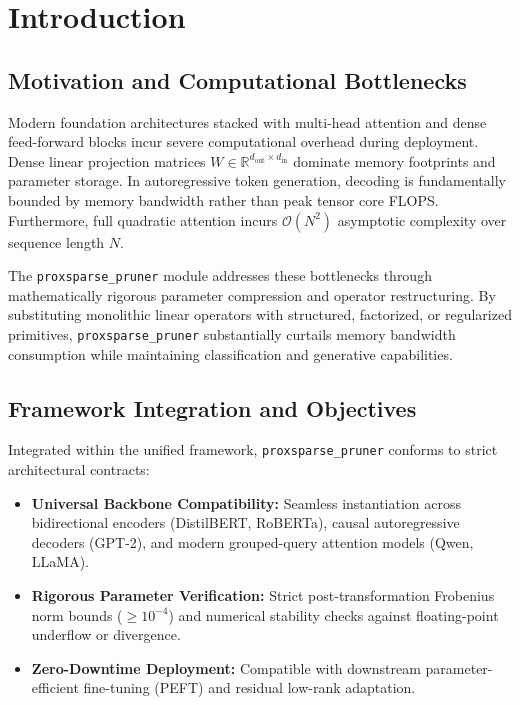 \section{Introduction}

\subsection{Motivation and Computational Bottlenecks}
Modern foundation architectures stacked with multi-head attention and dense feed-forward blocks incur severe computational overhead during deployment. Dense linear projection matrices $W \in \mathbb{R}^{d_{\text{out}} \times d_{\text{in}}}$ dominate memory footprints and parameter storage. In autoregressive token generation, decoding is fundamentally bounded by memory bandwidth rather than peak tensor core FLOPS. Furthermore, full quadratic attention incurs $\mathcal{O}(N^2)$ asymptotic complexity over sequence length $N$.

The \texttt{proxsparse\_pruner} module addresses these bottlenecks through mathematically rigorous parameter compression and operator restructuring. By substituting monolithic linear operators with structured, factorized, or regularized primitives, \texttt{proxsparse\_pruner} substantially curtails memory bandwidth consumption while maintaining classification and generative capabilities.

\subsection{Framework Integration and Objectives}
Integrated within the unified framework, \texttt{proxsparse\_pruner} conforms to strict architectural contracts:
\begin{itemize}
\item \textbf{Universal Backbone Compatibility:} Seamless instantiation across bidirectional encoders (DistilBERT, RoBERTa), causal autoregressive decoders (GPT-2), and modern grouped-query attention models (Qwen, LLaMA).
\item \textbf{Rigorous Parameter Verification:} Strict post-transformation Frobenius norm bounds ($\ge 10^{-4}$) and numerical stability checks against floating-point underflow or divergence.
\item \textbf{Zero-Downtime Deployment:} Compatible with downstream parameter-efficient fine-tuning (PEFT) and residual low-rank adaptation.
\end{itemize}
